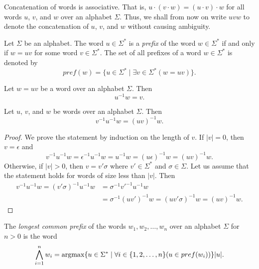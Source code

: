 Concatenation of words is associative. That is, $u \cdot (v \cdot w) = (u \cdot v)
\cdot w$ for all words $u$, $v$, and $w$ over an alphabet $\Sigma$. Thus, we shall
from now on write $uvw$ to denote the concatenation of $u$, $v$, and $w$ without
causing ambiguity.

\begin{definition}
  Let $\Sigma$ be an alphabet. The word $u \in \Sigma^*$ is a \emph{prefix} of the
  word $w \in \Sigma^*$ if and only if $w = uv$ for some word $v \in \Sigma^*$. The
  set of all prefixes of a word $w \in \Sigma^*$ is denoted by
  \begin{equation*}
    pref(w) = \{ u \in \Sigma^* \mid \exists v \in \Sigma^* (w = uv) \}.
  \end{equation*}
\end{definition}

\begin{definition}
  Let $w = uv$ be a word over an alphabet $\Sigma$. Then
  \begin{equation*}
    u^{-1}w = v.
  \end{equation*}
\end{definition}

\begin{proposition}
  \label{proposition:left_word_factor}
  Let $u$, $v$, and $w$ be words over an alphabet $\Sigma$. Then
  \begin{equation*}
    v^{-1}u^{-1}w = (uv)^{-1}w.
  \end{equation*}
\end{proposition}

\begin{proof}
  We prove the statement by induction on the length of $v$. If $|v| = 0$, then $v =
  \epsilon$ and
  \begin{equation*}
    v^{-1}u^{-1}w = \epsilon^{-1}u^{-1}w = u^{-1}w = (u\epsilon)^{-1}w = (uv)^{-1}w.
  \end{equation*}
  Otherwise, if $|v| > 0$, then $v = v'\sigma$ where $v' \in \Sigma^*$ and $\sigma
  \in \Sigma$. Let us assume that the statement holds for words of size less than
  $|v|$. Then
  \begin{align*}
    v^{-1}u^{-1}w
    = (v'\sigma)^{-1}u^{-1}w
     & = \sigma^{-1}v'^{-1}u^{-1}w \\
     & = \sigma^{-1}(uv')^{-1}w
    = (uv'\sigma)^{-1}w
    = (uv)^{-1}w.
  \end{align*}
\end{proof}

\begin{definition}
  The \emph{longest common prefix} of the words $w_1, w_2, \ldots, w_n$ over an
  alphabet $\Sigma$ for $n > 0$ is the word
  \begin{equation*}
    \bigwedge_{i=1}^n w_i = \operatorname*{argmax} \{ u \in \Sigma^* \mid \forall i \in \{ 1, 2,
    \ldots, n \} (u \in pref(w_i)) \} |u|.
  \end{equation*}
\end{definition}

